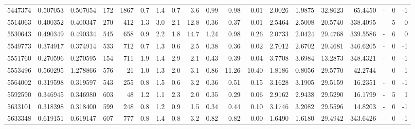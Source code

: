 \begin{tabular}{rrrrrrrrrrrrrrrrlrr}
   5447374 & 0.507053 &   0.507054 &  172 & 1867 &      0.7 &      1.4 &     0.7 &      3.6 &       0.99 &        0.98 &        0.01 &  2.0026 &  1.9875 &   32.8623 &   65.4450 &             - &        0 &         -1 \\
   5514063 & 0.400352 &   0.400347 &  270 &  412 &      1.3 &      3.0 &     2.1 &     12.8 &       0.36 &        0.37 &        0.01 &  2.5464 &  2.5008 &   20.5740 &  338.4095 &             - &        5 &          0 \\
   5530643 & 0.490349 &   0.490334 &  545 &  658 &      0.9 &      2.2 &     1.8 &     14.7 &       1.24 &        0.98 &        0.26 &  2.0733 &  2.0424 &   29.4768 &  339.5586 &             - &        6 &          0 \\
   5549773 & 0.374917 &   0.374914 &  533 &  712 &      0.7 &      1.3 &     0.6 &      2.5 &       0.38 &        0.36 &        0.02 &  2.7012 &  2.6702 &   29.4681 &  346.6205 &             - &        0 &         -1 \\
   5551760 & 0.270596 &   0.270595 &  154 &  711 &      1.9 &      1.4 &     2.9 &      2.1 &       0.43 &        0.39 &        0.04 &  3.7708 &  3.6984 &   13.2873 &  348.4321 &             - &        0 &         -1 \\
   5553496 & 0.560295 &   1.278866 &  576 &   21 &      1.0 &      1.3 &     2.0 &      3.1 &       0.86 &       11.26 &       10.40 &  1.8186 &  0.8056 &   29.5770 &   42.2744 &             - &        0 &         -1 \\
   5564002 & 0.319598 &   0.319597 &  543 &  255 &      0.8 &      1.5 &     0.6 &      3.2 &       0.36 &        0.51 &        0.15 &  3.1628 &  3.1905 &   29.5159 &   16.2351 &             - &        0 &         -1 \\
   5592590 & 0.346945 &   0.346980 &  603 &   48 &      1.2 &      1.1 &     2.3 &      2.0 &       0.35 &        0.29 &        0.06 &  2.9162 &  2.9438 &   29.5290 &   16.1799 &             - &        5 &          1 \\
   5633101 & 0.318398 &   0.318400 &  599 &  248 &      0.8 &      1.2 &     0.9 &      1.5 &       0.34 &        0.44 &        0.10 &  3.1746 &  3.2082 &   29.5596 &   14.8203 &             - &        0 &         -1 \\
   5633348 & 0.619151 &   0.619147 &  607 &  777 &      0.8 &      1.4 &     0.8 &      3.2 &       0.82 &        0.82 &        0.00 &  1.6490 &  1.6180 &   29.4942 &  343.6426 &             - &        0 &         -1 \\

\end{tabular}
